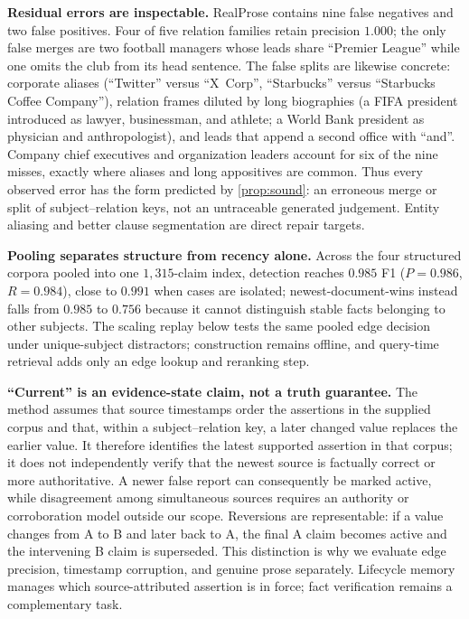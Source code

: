 \documentclass[letterpaper]{article}
\theoremstyle{plain}
\begin{document}
\noindent\textbf{Residual errors are inspectable.} RealProse contains nine false negatives and two false positives. Four of five relation families retain precision $1.000$; the only false merges are two football managers whose leads share ``Premier League'' while one omits the club from its head sentence. The false splits are likewise concrete: corporate aliases (``Twitter'' versus ``X~Corp'', ``Starbucks'' versus ``Starbucks Coffee Company''), relation frames diluted by long biographies (a FIFA president introduced as lawyer, businessman, and athlete; a World Bank president as physician and anthropologist), and leads that append a second office with ``and''. Company chief executives and organization leaders account for six of the nine misses, exactly where aliases and long appositives are common. Thus every observed error has the form predicted by \cref{prop:sound}: an erroneous merge or split of subject--relation keys, not an untraceable generated judgement. Entity aliasing and better clause segmentation are direct repair targets.

\noindent\textbf{Pooling separates structure from recency alone.} Across the four structured corpora pooled into one $1{,}315$-claim index, detection reaches $0.985$ F1 ($P{=}0.986$, $R{=}0.984$), close to $0.991$ when cases are isolated; newest-document-wins instead falls from $0.985$ to $0.756$ because it cannot distinguish stable facts belonging to other subjects. The scaling replay below tests the same pooled edge decision under unique-subject distractors; construction remains offline, and query-time retrieval adds only an edge lookup and reranking step.

\noindent\textbf{``Current'' is an evidence-state claim, not a truth guarantee.} The method assumes that source timestamps order the assertions in the supplied corpus and that, within a subject--relation key, a later changed value replaces the earlier value. It therefore identifies the latest supported assertion in that corpus; it does not independently verify that the newest source is factually correct or more authoritative. A newer false report can consequently be marked active, while disagreement among simultaneous sources requires an authority or corroboration model outside our scope. Reversions are representable: if a value changes from A to B and later back to A, the final A claim becomes active and the intervening B claim is superseded. This distinction is why we evaluate edge precision, timestamp corruption, and genuine prose separately. Lifecycle memory manages which source-attributed assertion is in force; fact verification remains a complementary task.
\end{document}
